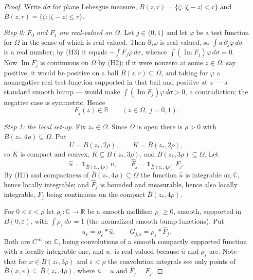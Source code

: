 \begin{proof}
Write $d\sigma$ for plane Lebesgue measure, $B(z,r)=\{\zeta:|\zeta-z|<r\}$ and
$\bar B(z,r)=\{\zeta:|\zeta-z|\le r\}$.

\emph{Step 0: $F_0$ and $F_1$ are real-valued on $\Omega$.}  Let $j\in\{0,1\}$
and let $\varphi$ be a test function for $\Omega$ in the sense of
 which is real-valued.  Then $\partial_j\varphi$ is
real-valued, so $\int u\,\partial_j\varphi\,d\sigma$ is a real number; by (H3)
it equals $-\int F_j\varphi\,d\sigma$, whence
$\int(\operatorname{Im}F_j)\varphi\,d\sigma=0$.  Now
$\operatorname{Im}F_j$ is continuous on $\Omega$ by (H2); if it were nonzero at
some $z\in\Omega$, say positive, it would be positive on a ball
$B(z,r)\subseteq\Omega$, and taking for $\varphi$ a nonnegative real test
function supported in that ball and positive at $z$ --- a standard smooth bump
--- would make $\int(\operatorname{Im}F_j)\varphi\,d\sigma>0$, a
contradiction; the negative case is symmetric.  Hence
\begin{equation}\tag{0}
  F_j(z)\in\mathbb{R}\qquad(z\in\Omega,\ j=0,1).
\end{equation}

\emph{Step 1: the local set-up.}  Fix $z_*\in\Omega$.  Since $\Omega$ is open
there is $\rho>0$ with $\bar B(z_*,4\rho)\subseteq\Omega$.  Put
\[
  U=B(z_*,2\rho),\qquad K=\bar B(z_*,2\rho),
\]
so $K$ is compact and convex, $K\subseteq B(z_*,3\rho)$, and
$\bar B(z_*,3\rho)\subseteq\Omega$.  Let
\[
  \hat u=\mathbf{1}_{\bar B(z_*,4\rho)}\,u,\qquad
  \hat F_j=\mathbf{1}_{\bar B(z_*,4\rho)}\,F_j .
\]
By (H1) and compactness of $\bar B(z_*,4\rho)\subseteq\Omega$ the function
$\hat u$ is integrable on $\mathbb{C}$, hence locally integrable; and $\hat F_j$
is bounded and measurable, hence also locally integrable, $F_j$ being
continuous on the compact $\bar B(z_*,4\rho)$.

For $0<\varepsilon<\rho$ let $\rho_\varepsilon\colon\mathbb{C}\to\mathbb{R}$ be
a smooth mollifier: $\rho_\varepsilon\ge0$, smooth, supported in
$\bar B(0,\varepsilon)$, with $\int\rho_\varepsilon\,d\sigma=1$ (the normalized
smooth bump functions).  Put
\[
  u_\varepsilon=\rho_\varepsilon*\hat u,\qquad
  G_{j,\varepsilon}=\rho_\varepsilon*\hat F_j .
\]
Both are $C^\infty$ on $\mathbb{C}$, being convolutions of a smooth compactly
supported function with a locally integrable one, and $u_\varepsilon$ is
real-valued because $\hat u$ and $\rho_\varepsilon$ are.  Note that for
$x\in B(z_*,3\rho)$ and $\varepsilon<\rho$ the convolution integrals see only
points of $\bar B(x,\varepsilon)\subseteq\bar B(z_*,4\rho)$, where $\hat u=u$
and $\hat F_j=F_j$.


\end{proof}
